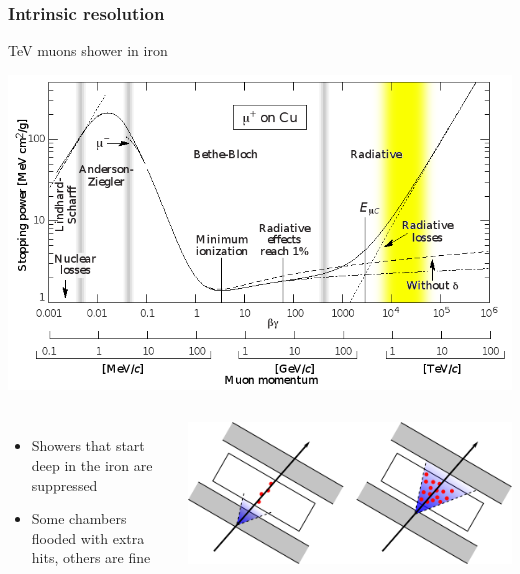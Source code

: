 \documentclass[compress]{beamer}
\begin{document}
\begin{frame}
\frametitle{Intrinsic resolution}
TeV muons shower in iron
\begin{center}
\includegraphics[width=0.7\linewidth]{pdgplot.png}
\end{center}

\begin{columns}
\small
\begin{itemize}
\item Showers that start deep in the iron are suppressed
\item Some chambers flooded with extra hits, others are fine
\end{itemize}

\includegraphics[width=\linewidth]{showering_hits.png}
\end{columns}
\end{frame}
\end{document}
